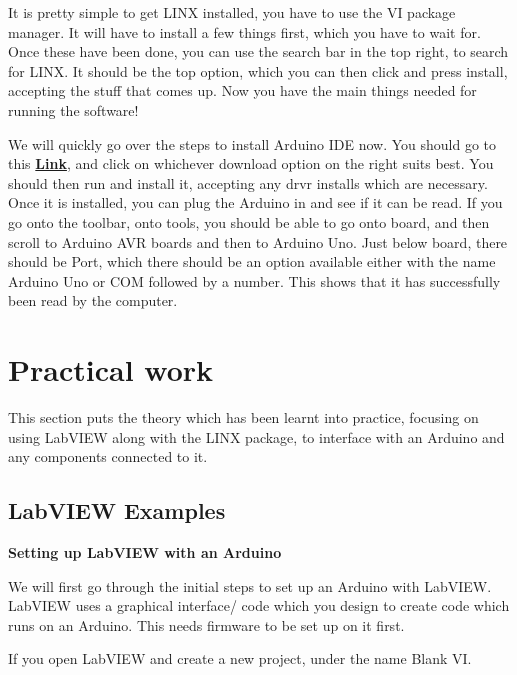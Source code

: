 \documentclass[a4paper,11pt]{report}
\let\oldhref\href %
\renewcommand{\href}[2]{\oldhref{#1}{\bfseries#2}}
\begin{document}
It is pretty simple to get LINX installed, you have to use the VI package manager. It will have to install a few things first, which you have to wait for. Once these have been done, you can use the search bar in the top right, to search for LINX. It should be the top option, which you can then click and press install, accepting the stuff that comes up. Now you have the main things needed for running the software!

We will quickly go over the steps to install Arduino IDE now. You should go to this \href{https://www.arduino.cc/en/software}{Link}, and click on whichever download option on the right suits best. You should then run and install it, accepting any \gls{drvr} installs which are necessary. Once it is installed, you can plug the Arduino in and see if it can be read. If you go onto the toolbar, onto tools, you should be able to go onto board, and then scroll to Arduino AVR boards and then to Arduino Uno. Just below board, there should be Port, which there should be an option available either with the name Arduino Uno or COM followed by a number. This shows that it has successfully been read by the computer.

\pagebreak

\section{Practical work}

This section puts the theory which has been learnt into practice, focusing on using LabVIEW along with the LINX package, to interface with an Arduino and any components connected to it.

\vspace*{1\baselineskip}

\subsection{LabVIEW Examples}

\textbf{Setting up LabVIEW with an Arduino}

We will first go through the initial steps to set up an Arduino with LabVIEW. LabVIEW uses a graphical interface/ code which you design to create code which runs on an Arduino. This needs firmware to be set up on it first.

If you open LabVIEW and create a new project, under the name Blank VI.
\end{document}
